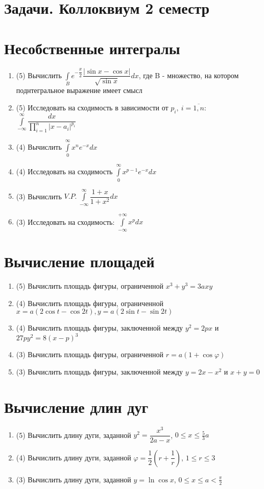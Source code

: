 \documentclass[9pt, a4paper]{extarticle}
\numberwithin{equation}{section}
\numberwithin{lemma}{section}
\numberwithin{definition}{section}
\numberwithin{notabene}{section}
\numberwithin{corollary}{section}
\begin{document}
	\section*{Задачи. Коллоквиум 2 семестр}
	\section{ Несобственные интегралы}
	\begin{enumerate}
		\item (5) 	Вычислить $\int\limits_B e^{-\dfrac{x}{2}} \dfrac{|\sin{x} - \cos{x}|}{\sqrt{\sin{x}}}dx$, 
		где B - множество, на котором поднтегральное выражение имеет смысл
		\item (5) 	Исследовать на сходимость в зависимости от $p_i, \ i = \overline{1,n}$: $\int\limits_{-\infty}^{\infty} \dfrac{dx}{\prod_{i=1}^n |x - a_i|^{p_i}}$
		\item (4) Вычислить $\int\limits_0^{\infty} x^n e^{-x} dx$
		\item (4) Исследовать на сходимость $\int\limits_{0}^{\infty} x^{p-1} e^{-x} dx$
		\item (3) Вычислить $V.P. \ \int\limits_{-\infty}^{\infty} \dfrac{1+x}{1+x^2}dx$
		\item (3) Исследовать на сходимость:  $\int\limits_{-\infty}^{+\infty} x^p dx$
	\end{enumerate}
	\section{Вычисление площадей}
	\begin{enumerate}
		\item (5) Вычислить площадь фигуры, ограниченной $x^3 + y^3 = 3axy$
		\item (4) Вычислить площадь фигуры, ограниченной $ x = a(2\cos{t} - \cos{2t}), y = a (2\sin{t}  - \sin{2t})$
		\item (4) Вычислить площадь фигуры, заключенной между $y^2 = 2px$ и $27py^2 = 8(x-p)^3$
		\item (3) Вычислить площадь фигуры, ограниченной $r = a(1 + \cos{\varphi})$ 
		\item (3) Вычислить площадь фигуры, заключенной между $y = 2x-x^2$ и $x + y = 0$
	\end{enumerate}
	\section{Вычисление длин дуг}
	\begin{enumerate}
		\item (5) Вычислить длину дуги, заданной $y^2 = \dfrac{x^3}{2a -x}$, $0 \leq x \leq \frac{5}{3}a$
		\item (4) Вычислить длину дуги, заданной $\varphi = \dfrac{1}{2}\left(r + \dfrac1{r}\right)$, $1 \leq r \leq 3$
		\item (3) Вычислить длину дуги, заданной $y = \ln{\cos{x}}$, $0 \leq x \leq a < \frac\pi2$
	\end{enumerate}
\end{document}

